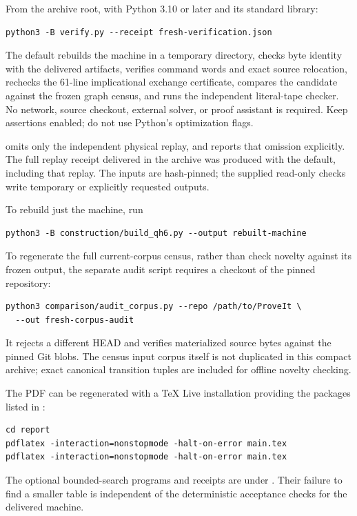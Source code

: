From the archive root, with Python 3.10 or later and its standard library:
\begin{verbatim}
python3 -B verify.py --receipt fresh-verification.json
\end{verbatim}
The default rebuilds the machine in a temporary directory, checks byte
identity with the delivered artifacts, verifies command words and exact
source relocation, rechecks the 61-line implicational exchange certificate,
compares the candidate against the frozen graph census, and runs the
independent literal-tape checker. No network, source checkout, external
solver, or proof assistant is required. Keep assertions enabled; do not
use Python's optimization flags.

 omits only the independent physical replay, and reports that
omission explicitly. The full replay receipt delivered in the archive was
produced with the default, including that replay. The inputs are hash-pinned;
the supplied read-only checks write temporary or explicitly requested outputs.

To rebuild just the machine, run
\begin{verbatim}
python3 -B construction/build_qh6.py --output rebuilt-machine
\end{verbatim}
To regenerate the full current-corpus census, rather than check novelty
against its frozen output, the separate audit script requires a checkout
of the pinned repository:
\begin{verbatim}
python3 comparison/audit_corpus.py --repo /path/to/ProveIt \
  --out fresh-corpus-audit
\end{verbatim}
It rejects a different HEAD and verifies materialized source bytes against
the pinned Git blobs. The census input corpus itself is not duplicated in
this compact archive; exact canonical transition tuples are included for
offline novelty checking.

The PDF can be regenerated with a TeX Live installation providing the
packages listed in \file{report/main.tex}:
\begin{verbatim}
cd report
pdflatex -interaction=nonstopmode -halt-on-error main.tex
pdflatex -interaction=nonstopmode -halt-on-error main.tex
\end{verbatim}
The optional bounded-search programs and receipts are under
. Their failure to find a smaller table is independent of
the deterministic acceptance checks for the delivered machine.
